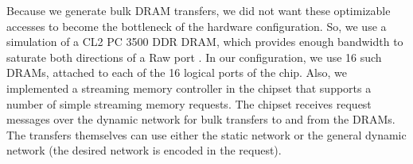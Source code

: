 Because we generate bulk DRAM transfers, we did not want these
optimizable accesses to become the bottleneck of the hardware
configuration.  So, we use a simulation of a CL2 PC 3500 DDR DRAM,
which provides enough bandwidth to saturate both directions of a Raw
port \cite{raw_isca}.  In our configuration, we use 16 such DRAMs,
attached to each of the 16 logical ports of the chip.  Also, we
implemented a streaming memory controller in the chipset that supports
a number of simple streaming memory requests.  The chipset receives
request messages over the dynamic network for bulk transfers to and
from the DRAMs.  The transfers themselves can use either the static
network or the general dynamic network (the desired network is encoded
in the request).  


